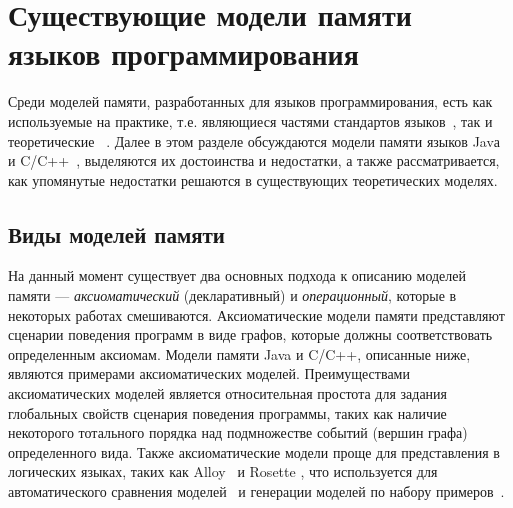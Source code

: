 





\section{Существующие модели памяти языков программирования}
Среди моделей памяти, разработанных для языков программирования, есть как используемые на практике,
т.е. являющиеся частями стандартов языков~\cite{Gosling-al:BOOK96,JavaStandard,C:11,CPP:11}, так и теоретические~%
\cite{Crary-Sullivan:POPL15,Lamport:TC79,Boudol-al:EXPRESS12,Boudol-Petri:POPL09,PichonPharabod-Sewell:POPL16,Jeffrey-Riely:LICS16}.
Далее в этом разделе обсуждаются модели памяти языков Javа~\cite{JavaStandard} и C/C++~\cite{C:11,CPP:11},
выделяются их достоинства и недостатки, а также рассматривается, как упомянутые недостатки решаются в существующих
теоретических моделях.

\subsection{Виды моделей памяти}
На данный момент существует два основных подхода к описанию моделей памяти ---
\emph{аксиоматический} (декларативный) и \emph{операционный}, которые в некоторых работах смешиваются.
Аксиоматические модели памяти представляют сценарии поведения программ в виде графов, которые
должны соответствовать определенным аксиомам.
Модели памяти Java и C/C++, описанные ниже, являются примерами аксиоматических моделей.
Преимуществами аксиоматических моделей является относительная простота для задания глобальных
свойств сценария поведения программы,
таких как наличие некоторого тотального порядка над подмножестве событий (вершин графа)
определенного вида.
Также аксиоматические модели проще для представления в логических языках,
таких как Alloy~\cite{Jackson:Book06} и Rosette
\cite{Torlak-Bodik:Onward13,Torlak-Bodik:PLDI14}, что используется
для автоматического сравнения моделей~\cite{Wickerson-al:POPL17}
и генерации моделей по набору примеров~\cite{Bornholt-Torlak:PLDI17}.

